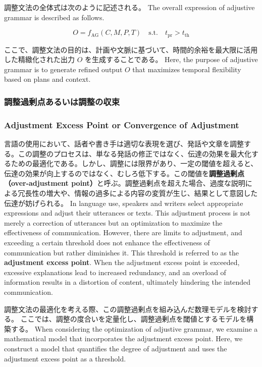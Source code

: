 \documentclass[a4paper,xelatex,ja=standard]{bxjsarticle}
\begin{document}
\ifJPN
調整文法の全体式は次のように記述される。
\else
The overall expression of adjustive grammar is described as follows.
\fi

\[
O = f_{\text{AG}}(C, M, P, T) \quad \text{s.t.} \quad t_{\text{pr}} > t_{\text{th}}
\]

\ifJPN
ここで、調整文法の目的は、計画や文脈に基づいて、時間的余裕を最大限に活用した精緻化された出力 \( O \) を生成することである。
\else
Here, the purpose of adjustive grammar is to generate refined output \( O \) that maximizes temporal flexibility based on plans and context.
\fi

\ifJPN
\subsubsection{調整過剰点あるいは調整の収束}
\else
\subsubsection{Adjustment Excess Point or Convergence of Adjustment}
\fi

\ifJPN
言語の使用において、話者や書き手は適切な表現を選び、発話や文章を調整する。この調整のプロセスは、単なる発話の修正ではなく、伝達の効果を最大化するための最適化である。しかし、調整には限界があり、一定の閾値を超えると、伝達の効果が向上するのではなく、むしろ低下する。この閾値を\textbf{調整過剰点（over-adjustment point）}と呼ぶ。調整過剰点を超えた場合、過度な説明による冗長性の増大や、情報の過多による内容の変質が生じ、結果として意図した伝達が妨げられる。
\else
  In language use, speakers and writers select appropriate expressions and adjust their utterances or texts. This adjustment process is not merely a correction of utterances but an optimization to maximize the effectiveness of communication. However, there are limits to adjustment, and exceeding a certain threshold does not enhance the effectiveness of communication but rather diminishes it. This threshold is referred to as the \textbf{adjustment excess point}. When the adjustment excess point is exceeded, excessive explanations lead to increased redundancy, and an overload of information results in a distortion of content, ultimately hindering the intended communication.
\fi

\ifJPN
調整文法の最適化を考える際、この調整過剰点を組み込んだ数理モデルを検討する。
ここでは、調整の度合いを定量化し、調整過剰点を閾値とするモデルを構築する。
\else
When considering the optimization of adjustive grammar, we examine a mathematical model that incorporates the adjustment excess point.
Here, we construct a model that quantifies the degree of adjustment and uses the adjustment excess point as a threshold.
\fi
\end{document}
